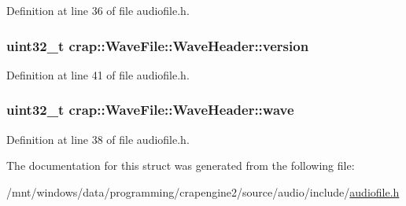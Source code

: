 Definition at line 36 of file audiofile.\+h.

\hypertarget{structcrap_1_1_wave_file_1_1_wave_header_ac2091625d4920909edeee79423f884b1}{
\subsubsection[{version}]{\setlength{\rightskip}{0pt plus 5cm}uint32\+\_\+t crap\+::\+Wave\+File\+::\+Wave\+Header\+::version}}\label{structcrap_1_1_wave_file_1_1_wave_header_ac2091625d4920909edeee79423f884b1}


Definition at line 41 of file audiofile.\+h.

\hypertarget{structcrap_1_1_wave_file_1_1_wave_header_a4d2d3de7ee47f37c098224695afc9ced}{
\subsubsection[{wave}]{\setlength{\rightskip}{0pt plus 5cm}uint32\+\_\+t crap\+::\+Wave\+File\+::\+Wave\+Header\+::wave}}\label{structcrap_1_1_wave_file_1_1_wave_header_a4d2d3de7ee47f37c098224695afc9ced}


Definition at line 38 of file audiofile.\+h.



The documentation for this struct was generated from the following file\+:\begin{DoxyCompactItemize}
\item 
/mnt/windows/data/programming/crapengine2/source/audio/include/\hyperlink{audiofile_8h}{audiofile.\+h}\end{DoxyCompactItemize}
